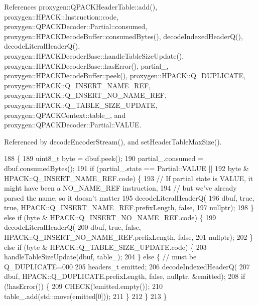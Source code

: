References proxygen\+::\+Q\+P\+A\+C\+K\+Header\+Table\+::add(), proxygen\+::\+H\+P\+A\+C\+K\+::\+Instruction\+::code, proxygen\+::\+Q\+P\+A\+C\+K\+Decoder\+::\+Partial\+::consumed, proxygen\+::\+H\+P\+A\+C\+K\+Decode\+Buffer\+::consumed\+Bytes(), decode\+Indexed\+Header\+Q(), decode\+Literal\+Header\+Q(), proxygen\+::\+H\+P\+A\+C\+K\+Decoder\+Base\+::handle\+Table\+Size\+Update(), proxygen\+::\+H\+P\+A\+C\+K\+Decoder\+Base\+::has\+Error(), partial\+\_\+, proxygen\+::\+H\+P\+A\+C\+K\+Decode\+Buffer\+::peek(), proxygen\+::\+H\+P\+A\+C\+K\+::\+Q\+\_\+\+D\+U\+P\+L\+I\+C\+A\+TE, proxygen\+::\+H\+P\+A\+C\+K\+::\+Q\+\_\+\+I\+N\+S\+E\+R\+T\+\_\+\+N\+A\+M\+E\+\_\+\+R\+EF, proxygen\+::\+H\+P\+A\+C\+K\+::\+Q\+\_\+\+I\+N\+S\+E\+R\+T\+\_\+\+N\+O\+\_\+\+N\+A\+M\+E\+\_\+\+R\+EF, proxygen\+::\+H\+P\+A\+C\+K\+::\+Q\+\_\+\+T\+A\+B\+L\+E\+\_\+\+S\+I\+Z\+E\+\_\+\+U\+P\+D\+A\+TE, proxygen\+::\+Q\+P\+A\+C\+K\+Context\+::table\+\_\+, and proxygen\+::\+Q\+P\+A\+C\+K\+Decoder\+::\+Partial\+::\+V\+A\+L\+UE.



Referenced by decode\+Encoder\+Stream(), and set\+Header\+Table\+Max\+Size().


\begin{DoxyCode}
188                                                                          \{
189   uint8\_t byte = dbuf.peek();
190   partial_.consumed = dbuf.consumedBytes();
191   \textcolor{keywordflow}{if} (partial_.state == Partial::VALUE ||
192       byte & HPACK::Q_INSERT_NAME_REF.code) \{
193     \textcolor{comment}{// If partial state is VALUE, it might have been a NO\_NAME\_REF instruction,}
194     \textcolor{comment}{// but we've already parsed the name, so it doesn't matter}
195     decodeLiteralHeaderQ(
196         dbuf, \textcolor{keyword}{true}, \textcolor{keyword}{true}, HPACK::Q\_INSERT\_NAME\_REF.prefixLength, \textcolor{keyword}{false},
197         \textcolor{keyword}{nullptr});
198   \} \textcolor{keywordflow}{else} \textcolor{keywordflow}{if} (byte & HPACK::Q_INSERT_NO_NAME_REF.code) \{
199     decodeLiteralHeaderQ(
200         dbuf, \textcolor{keyword}{true}, \textcolor{keyword}{false}, HPACK::Q_INSERT_NO_NAME_REF.prefixLength, \textcolor{keyword}{false},
201         \textcolor{keyword}{nullptr});
202   \} \textcolor{keywordflow}{else} \textcolor{keywordflow}{if} (byte & HPACK::Q_TABLE_SIZE_UPDATE.code) \{
203     handleTableSizeUpdate(dbuf, table_);
204   \} \textcolor{keywordflow}{else} \{ \textcolor{comment}{// must be Q\_DUPLICATE=000}
205     headers_t emitted;
206     decodeIndexedHeaderQ(
207         dbuf, HPACK::Q_DUPLICATE.prefixLength, \textcolor{keyword}{false}, \textcolor{keyword}{nullptr}, &emitted);
208     \textcolor{keywordflow}{if} (!hasError()) \{
209       CHECK(!emitted.empty());
210       table_.add(std::move(emitted[0]));
211     \}
212   \}
213 \}
\end{DoxyCode}
